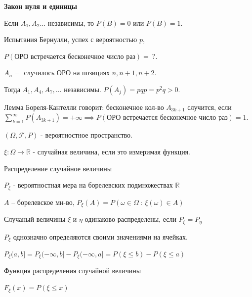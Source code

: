 \begin{theorem}
    \textbf{Закон нуля и единицы}

    Если $A_1, A_2 \ldots$ независимы, то $P(B) = 0$ или $P(B) = 1$.
\end{theorem}

\begin{example}
    Испытания Бернулли, успех с вероятностью $p$,
    
    $P(\text{ОРО встречается бесконечное число раз}) = \ ?$.

    $A_n = $ случилось $\text{ОРО}$ на позициях $n, n + 1, n + 2$.

    Тогда $A_1, A_4, A_7, \ldots$ независимы. $P(A_j) = pqp = p^2 q > 0$.

    Лемма Бореля-Кантелли говорит: бесконечное кол-во $A_{3k + 1}$ случится, если $\sum_{k=1}^{\infty} {P(A_{3k + 1})} = +\infty \implies P(\text{ОРО встречается бесконечное число раз}) = 1$. 
\end{example}


\begin{definition}
    $(\Omega, \mathcal{F}, P)$ - вероятностное пространство.

    $\xi: \Omega \to \mathbb{R}$ - случайная величина, если 
    это измеримая функция.
\end{definition}

\begin{definition}
    Распределение случайное величины

    $P_{\xi}$ - вероятностная мера на борелевских подмножествах 
    $\mathbb{R}$

    $A$ -- борелевское мн-во, $P_{\xi}(A) = P(\omega \in \Omega \ : \ \xi(\omega) \in A)$
\end{definition}

\begin{definition}
    Случаный величины $\xi$ и $\eta$ одинаково распределены, если
    $P_{\xi} = P_{\eta}$
\end{definition}

\begin{remark}
    $P_{\xi}$ однозначно определяются своими значениями на ячейках.

    $P_{\xi} (a, b] = P_{\xi} (-\infty, b] - P_{\xi} (-\infty, a] = 
    P(\xi \leqslant b) - P(\xi \leqslant a)$
\end{remark}

\begin{definition}
    Функция распределения случайной величины

    $F_{\xi} (x) = P(\xi \leqslant x)$
\end{definition}

